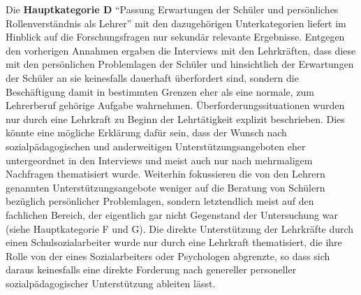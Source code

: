 \noindent
Die \textbf{Hauptkategorie D} "`Passung Erwartungen der Schüler und persönliches Rollenverständnis als Lehrer"' mit den dazugehörigen Unterkategorien liefert im Hinblick auf die Forschungsfragen nur sekundär relevante Ergebnisse. Entgegen den vorherigen Annahmen ergaben die Interviews mit den Lehrkräften, dass diese mit den persönlichen Problemlagen der Schüler und hinsichtlich der Erwartungen der Schüler an sie keinesfalls dauerhaft überfordert sind, sondern die Beschäftigung damit in bestimmten Grenzen eher als eine normale, zum Lehrerberuf gehörige Aufgabe wahrnehmen. Überforderungssituationen wurden nur durch eine Lehrkraft zu Beginn der Lehrtätigkeit explizit beschrieben. Dies könnte eine mögliche Erklärung dafür sein, dass der Wunsch nach sozialpädagogischen und anderweitigen Unterstützungsangeboten eher untergeordnet in den Interviews und meist auch nur nach mehrmaligem Nachfragen thematisiert wurde. Weiterhin fokussieren die von den Lehrern genannten Unterstützungsangebote weniger auf die Beratung von Schülern bezüglich persönlicher Problemlagen, sondern letztendlich meist auf den fachlichen Bereich, der eigentlich gar nicht Gegenstand der Untersuchung war (siehe Hauptkategorie F und G). Die direkte Unterstützung der Lehrkräfte durch einen Schulsozialarbeiter wurde nur durch eine Lehrkraft thematisiert, die ihre Rolle von der eines Sozialarbeiters oder Psychologen abgrenzte, so dass sich daraus keinesfalls eine direkte Forderung nach genereller personeller sozialpädagogischer Unterstützung ableiten lässt.\\


